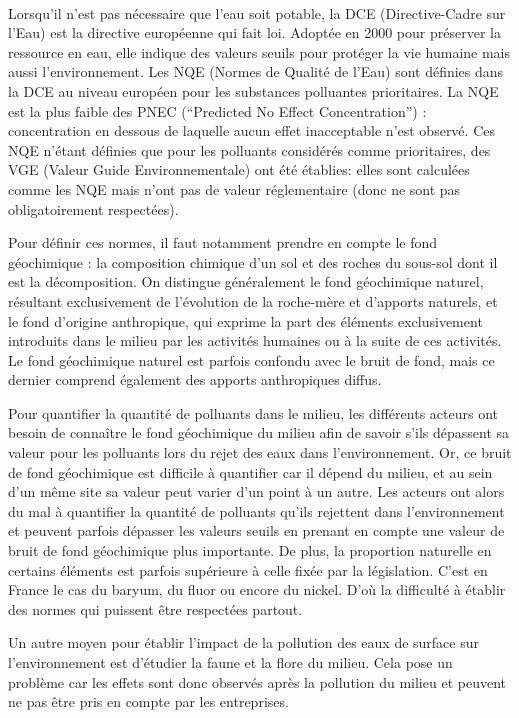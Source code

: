 \documentclass{article}
\begin{document}
\paragraph{} Lorsqu’il n’est pas nécessaire que l’eau soit potable, la DCE (Directive-Cadre sur l’Eau) est la directive européenne qui fait loi. Adoptée en 2000 pour préserver la ressource en eau, elle indique des valeurs seuils pour protéger la vie humaine mais aussi l’environnement. Les NQE (Normes de Qualité de l’Eau) sont définies dans la DCE au niveau européen pour les substances polluantes prioritaires. La NQE est la plus faible des PNEC (“Predicted No Effect Concentration”) : concentration en dessous de laquelle aucun effet inacceptable n’est observé. Ces NQE n’étant définies que pour les polluants considérés comme prioritaires, des VGE (Valeur Guide Environnementale) ont été établies: elles sont calculées comme les NQE mais n’ont pas de valeur réglementaire (donc ne sont pas obligatoirement respectées).

Pour définir ces normes, il faut notamment prendre en compte le fond géochimique : la composition chimique d'un sol et des roches du sous-sol dont il est la décomposition. On distingue généralement le fond géochimique naturel, résultant exclusivement de l'évolution de la roche-mère et d'apports naturels, et le fond d'origine anthropique, qui exprime la part des éléments exclusivement introduits dans le milieu par les activités humaines ou à la suite de ces activités. Le fond géochimique naturel est parfois confondu avec le  bruit de fond, mais ce dernier comprend également des apports anthropiques diffus.

Pour quantifier la quantité de polluants dans le milieu, les différents acteurs ont besoin de connaître le fond géochimique du milieu afin de savoir s’ils dépassent sa valeur pour les polluants lors du rejet des eaux dans l’environnement. Or, ce bruit de fond géochimique est difficile à quantifier car il dépend du milieu, et au sein d’un même site sa valeur peut varier d’un point à un autre. Les acteurs ont alors du mal à quantifier la quantité de polluants qu’ils rejettent dans l’environnement et peuvent parfois dépasser les valeurs seuils en prenant en compte une valeur de bruit de fond géochimique plus importante. De plus, la proportion naturelle en certains éléments est parfois supérieure à celle fixée par la législation. C’est en France le cas du baryum, du fluor ou encore du nickel. D’où la difficulté à établir des normes qui puissent être respectées partout. 

Un autre moyen pour établir l’impact de la pollution des eaux de surface sur l’environnement est d’étudier la faune et la flore du milieu. Cela pose un problème car les effets sont donc observés après la pollution du milieu et peuvent ne pas être pris en compte par les entreprises. 
\end{document}
